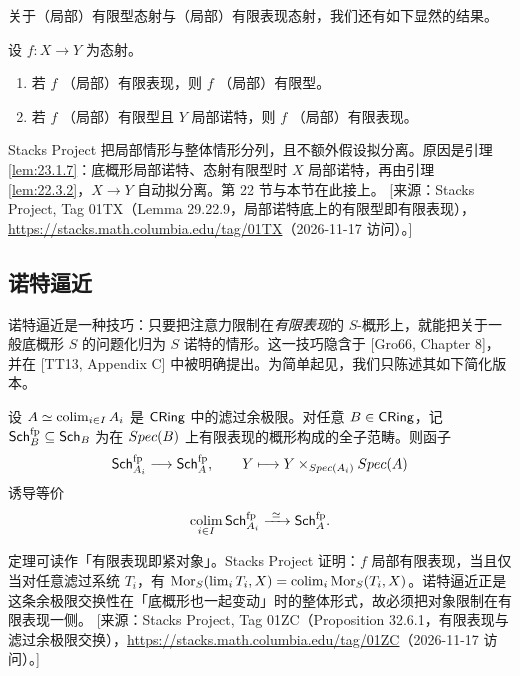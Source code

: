 关于（局部）有限型态射与（局部）有限表现态射，我们还有如下显然的结果。

\begin{lemma}\label{lem:23.2.7}
设 $f\colon X \to Y$ 为态射。
\begin{enumerate}[label=(\roman*),leftmargin=2em,itemsep=0.25ex]
  \item 若 $f$ （局部）有限表现，则 $f$ （局部）有限型。
  \item 若 $f$ （局部）有限型且 $Y$ 局部诺特，则 $f$ （局部）有限表现。
\end{enumerate}
\end{lemma}

\begin{yizhu}
Stacks Project 把局部情形与整体情形分列，且不额外假设拟分离。原因是引理 \ref{lem:23.1.7}：底概形局部诺特、态射有限型时 $X$ 局部诺特，再由引理 \ref{lem:22.3.2}，$X \to Y$ 自动拟分离。第 22 节与本节在此接上。
[来源：Stacks Project, Tag 01TX（Lemma 29.22.9，局部诺特底上的有限型即有限表现），\url{https://stacks.math.columbia.edu/tag/01TX}（2026-11-17 访问）。]
\end{yizhu}

\subsection{诺特逼近}\label{sec:23.3}

诺特逼近是一种技巧：只要把注意力限制在\emph{有限表现}的 $S$-概形上，就能把关于一般底概形 $S$ 的问题化归为 $S$ 诺特的情形。这一技巧隐含于 [Gro66, Chapter 8]，并在 [TT13, Appendix C] 中被明确提出。为简单起见，我们只陈述其如下简化版本。

\begin{theorem}\label{thm:23.3.1}
设 $A \simeq \operatorname*{colim}_{i \in I} A_i$ 是 $\mathsf{CRing}$ 中的滤过余极限。对任意 $B \in \mathsf{CRing}$，记 $\mathsf{Sch}^{\mathrm{fp}}_B \subseteq \mathsf{Sch}_B$ 为在 $Spec(B)$ 上有限表现的概形构成的全子范畴。则函子
\[
\mathsf{Sch}^{\mathrm{fp}}_{A_i} \longrightarrow \mathsf{Sch}^{\mathrm{fp}}_A, \qquad Y \longmapsto Y \times_{Spec(A_i)} Spec(A)
\]
诱导等价
\[
\operatorname*{colim}_{i \in I} \mathsf{Sch}^{\mathrm{fp}}_{A_i} \xrightarrow{\ \simeq\ } \mathsf{Sch}^{\mathrm{fp}}_A.
\]
\end{theorem}

\begin{yizhu}
定理可读作「有限表现即紧对象」。Stacks Project 证明：$f$ 局部有限表现，当且仅当对任意滤过系统 $T_i$，有 $\operatorname{Mor}_S(\lim_i T_i, X) = \operatorname*{colim}_i \operatorname{Mor}_S(T_i, X)$。诺特逼近正是这条余极限交换性在「底概形也一起变动」时的整体形式，故必须把对象限制在有限表现一侧。
[来源：Stacks Project, Tag 01ZC（Proposition 32.6.1，有限表现与滤过余极限交换），\url{https://stacks.math.columbia.edu/tag/01ZC}（2026-11-17 访问）。]
\end{yizhu}

